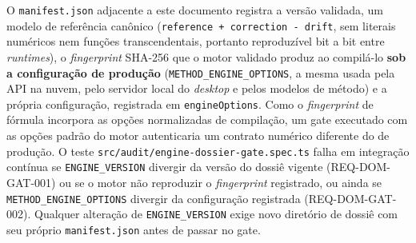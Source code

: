 \documentclass[11pt,a4paper]{article}
\begin{document}
O \texttt{manifest.json} adjacente a este documento registra a versão validada, um modelo de referência canônico (\texttt{reference + correction - drift}, sem literais numéricos nem funções transcendentais, portanto reproduzível bit a bit entre \emph{runtimes}), o \emph{fingerprint} SHA-256 que o motor validado produz ao compilá-lo \textbf{sob a configuração de produção} (\texttt{METHOD\_ENGINE\_OPTIONS}, a mesma usada pela API na nuvem, pelo servidor local do \emph{desktop} e pelos modelos de método) e a própria configuração, registrada em \texttt{engineOptions}. Como o \emph{fingerprint} de fórmula incorpora as opções normalizadas de compilação, um gate executado com as opções padrão do motor autenticaria um contrato numérico diferente do de produção. O teste \texttt{src/audit/engine-dossier-gate.spec.ts} falha em integração contínua se \texttt{ENGINE\_VERSION} divergir da versão do dossiê vigente (REQ-DOM-GAT-001) ou se o motor não reproduzir o \emph{fingerprint} registrado, ou ainda se \texttt{METHOD\_ENGINE\_OPTIONS} divergir da configuração registrada (REQ-DOM-GAT-002). Qualquer alteração de \texttt{ENGINE\_VERSION} exige novo diretório de dossiê com seu próprio \texttt{manifest.json} antes de passar no gate.
\end{document}
